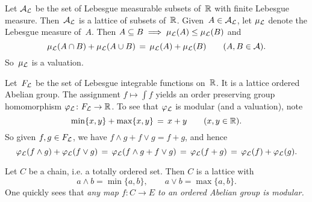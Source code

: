 \documentclass[main.tex]{subfiles}
\begin{document}
%
%
\begin{ex}
\label{E:lmeas-val}
Let $\mathcal{A}_{\mathcal{L}}$ be the set of Lebesgue measurable
subsets of~$\mathbb{R}$ with finite Lebesgue measure.
Then~$\mathcal{A}_{\mathcal{L}}$ is a lattice of subsets of~$\mathbb{R}$.
Given~$A\in\mathcal{A}_{\mathcal{L}}$,
let $\mu_{\mathcal{L}}$ denote the Lebesgue measure of~$A$.
Then $A\subseteq B \implies \mu_{\mathcal{L}}(A)\leq \mu_{\mathcal{L}} (B)$
and 
\begin{equation*}
\mu_{\mathcal{L}}(A\cap B) + \mu_{\mathcal{L}}(A\cup B) \,=\, \mu_{\mathcal{L}}(A) + \mu_{\mathcal{L}}(B)
\qquad(A,B\in\mathcal{A}).
\end{equation*}
So~$\mu_{\mathcal{L}}$ is a valuation.
\end{ex}

%
%
\begin{ex}
\label{E:int-val}
Let~$F_{\mathcal{L}}$ be the set of Lebesgue integrable functions on~$\mathbb{R}$.
It is a lattice ordered Abelian group.
The assignment $f\mapsto \int f$ 
yields an order preserving group homomorphism
$\varphi_{\mathcal{L}}\colon F_{\mathcal{L}}\rightarrow \mathbb{R}$.
To see that $\varphi_{\mathcal{L}}$ is modular (and a valuation),
note
\begin{equation*}
\min\{x,y\}+\max\{x,y\} \,=\, x+y\qquad(x,y\in \mathbb{R}).
\end{equation*}
So given $f,g\in F_{\mathcal{L}}$,
we have $f\wedge g + f \vee g = f+ g$,
and hence
\begin{equation*}
\varphi_{\mathcal{L}}(f\wedge g) + \varphi_{\mathcal{L}}(f\vee g) 
\,=\,\varphi_{\mathcal{L}}(f\wedge g + f\vee g)
\,=\, \varphi_{\mathcal{L}}(f+g)
\,=\, \varphi_{\mathcal{L}} (f)+\varphi_{\mathcal{L}}(g).
\end{equation*}
\end{ex}

%
%
\begin{ex}
Let $C$ be a chain,
i.e. a totally ordered set.
Then $C$ is a lattice with
\begin{equation*}
a\wedge b = \min\{a,b\},
 \qquad 
a\vee b = \max\{a,b\}.
\end{equation*}
One quickly sees that
\emph{any map $f\colon C\rightarrow E$
to an ordered Abelian group is modular.}
\end{ex}
\end{document}
